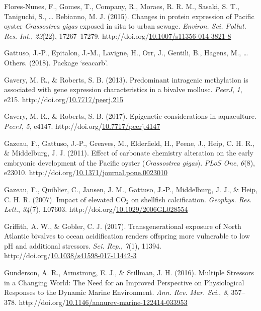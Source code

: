 \documentclass [11pt, proquest] {uwthesis}[2015/03/03]
\newlength{\cslhangindent}
\newenvironment{CSLReferences}%
{\setlength{\parindent}{0pt}%
\everypar{\setlength{\hangindent}{\cslhangindent}}\ignorespaces}%
{\par}
\begin{document}
\begin{CSLReferences}{1}{0}
\leavevmode\hypertarget{ref-Flores-Nunes2015}{}%
Flores-Nunes, F., Gomes, T., Company, R., Moraes, R. R. M., Sasaki, S. T., Taniguchi, S., \ldots{} Bebianno, M. J. (2015). {Changes in protein expression of Pacific oyster \emph{Crassostrea gigas} exposed in situ to urban sewage}. \emph{Environ. Sci. Pollut. Res. Int.}, \emph{22}(22), 17267--17279. http://doi.org/\href{https://doi.org/10.1007/s11356-014-3821-8}{10.1007/s11356-014-3821-8}

\leavevmode\hypertarget{ref-Gattuso2018}{}%
Gattuso, J.-P., Epitalon, J.-M., Lavigne, H., Orr, J., Gentili, B., Hagens, M., \ldots{} Others. (2018). {Package {`seacarb'}}.

\leavevmode\hypertarget{ref-Gavery2013}{}%
Gavery, M. R., \& Roberts, S. B. (2013). {Predominant intragenic methylation is associated with gene expression characteristics in a bivalve mollusc}. \emph{PeerJ}, \emph{1}, e215. http://doi.org/\href{https://doi.org/10.7717/peerj.215}{10.7717/peerj.215}

\leavevmode\hypertarget{ref-Gavery2017}{}%
Gavery, M. R., \& Roberts, S. B. (2017). {Epigenetic considerations in aquaculture}. \emph{PeerJ}, \emph{5}, e4147. http://doi.org/\href{https://doi.org/10.7717/peerj.4147}{10.7717/peerj.4147}

\leavevmode\hypertarget{ref-Gazeau2011}{}%
Gazeau, F., Gattuso, J.-P., Greaves, M., Elderfield, H., Peene, J., Heip, C. H. R., \& Middelburg, J. J. (2011). {Effect of carbonate chemistry alteration on the early embryonic development of the Pacific oyster (\emph{Crassostrea gigas})}. \emph{PLoS One}, \emph{6}(8), e23010. http://doi.org/\href{https://doi.org/10.1371/journal.pone.0023010}{10.1371/journal.pone.0023010}

\leavevmode\hypertarget{ref-Gazeau2007}{}%
Gazeau, F., Quiblier, C., Jansen, J. M., Gattuso, J.-P., Middelburg, J. J., \& Heip, C. H. R. (2007). {Impact of elevated {CO\(_2\)} on shellfish calcification}. \emph{Geophys. Res. Lett.}, \emph{34}(7), L07603. http://doi.org/\href{https://doi.org/10.1029/2006GL028554}{10.1029/2006GL028554}

\leavevmode\hypertarget{ref-Griffith2017}{}%
Griffith, A. W., \& Gobler, C. J. (2017). {Transgenerational exposure of North Atlantic bivalves to ocean acidification renders offspring more vulnerable to low pH and additional stressors}. \emph{Sci. Rep.}, \emph{7}(1), 11394. http://doi.org/\href{https://doi.org/10.1038/s41598-017-11442-3}{10.1038/s41598-017-11442-3}

\leavevmode\hypertarget{ref-Gunderson2016}{}%
Gunderson, A. R., Armstrong, E. J., \& Stillman, J. H. (2016). {Multiple Stressors in a Changing World: The Need for an Improved Perspective on Physiological Responses to the Dynamic Marine Environment}. \emph{Ann. Rev. Mar. Sci.}, \emph{8}, 357--378. http://doi.org/\href{https://doi.org/10.1146/annurev-marine-122414-033953}{10.1146/annurev-marine-122414-033953}


\end{CSLReferences}
\end{document}
